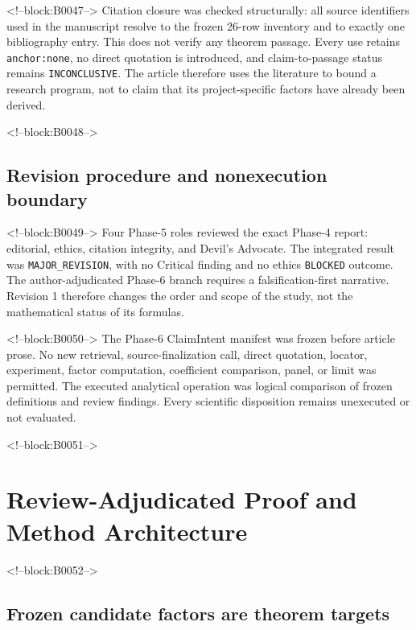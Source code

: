 \documentclass[11pt]{article}
\begin{document}
<!--block:B0047-->
Citation closure was checked structurally: all source identifiers used
in the manuscript resolve to the frozen 26-row inventory and to exactly
one bibliography entry. This does not verify any theorem passage. Every
use retains \texttt{anchor:none}, no direct quotation is introduced,
and claim-to-passage status remains \texttt{INCONCLUSIVE}. The article
therefore uses the literature to bound a research program, not to claim
that its project-specific factors have already been derived.

<!--block:B0048-->
\hypertarget{32-revision-procedure-and-nonexecution-boundary}{%
\subsection{Revision procedure and nonexecution
boundary}\label{32-revision-procedure-and-nonexecution-boundary}}

<!--block:B0049-->
Four Phase-5 roles reviewed the exact Phase-4 report: editorial, ethics,
citation integrity, and Devil's Advocate. The integrated result was
\texttt{MAJOR\_REVISION}, with no Critical finding and no ethics
\texttt{BLOCKED} outcome. The author-adjudicated Phase-6 branch requires
a falsification-first narrative. Revision 1 therefore changes the order
and scope of the study, not the mathematical status of its formulas.

<!--block:B0050-->
The Phase-6 ClaimIntent manifest was frozen before article prose. No new
retrieval, source-finalization call, direct quotation, locator,
experiment, factor computation, coefficient comparison, panel, or limit
was permitted. The executed analytical operation was logical comparison
of frozen definitions and review findings. Every scientific disposition
remains unexecuted or not evaluated.

<!--block:B0051-->
\hypertarget{4-review-adjudicated-proof-and-method-architecture}{%
\section{Review-Adjudicated Proof and Method
Architecture}\label{4-review-adjudicated-proof-and-method-architecture}}

<!--block:B0052-->
\hypertarget{41-frozen-candidate-factors-are-theorem-targets}{%
\subsection{Frozen candidate factors are theorem
targets}\label{41-frozen-candidate-factors-are-theorem-targets}}
\end{document}
